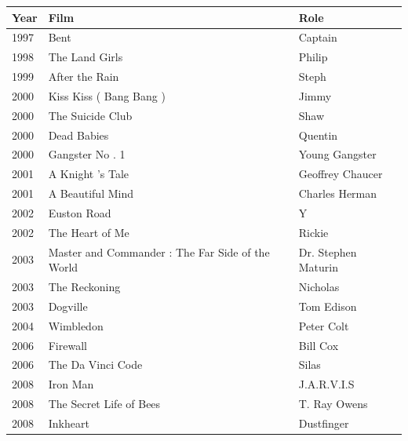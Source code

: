 \documentclass{article}
\begin{document}
\begin{tabular}{lll}
\toprule
Year & Film & Role \\
\midrule
1997 & Bent & Captain \\
1998 & The Land Girls & Philip \\
1999 & After the Rain & Steph \\
2000 & Kiss Kiss ( Bang Bang ) & Jimmy \\
2000 & The Suicide Club & Shaw \\
2000 & Dead Babies & Quentin \\
2000 & Gangster No . 1 & Young Gangster \\
2001 & A Knight 's Tale & Geoffrey Chaucer \\
2001 & A Beautiful Mind & Charles Herman \\
2002 & Euston Road & Y \\
2002 & The Heart of Me & Rickie \\
2003 & Master and Commander : The Far Side of the World & Dr. Stephen Maturin \\
2003 & The Reckoning & Nicholas \\
2003 & Dogville & Tom Edison \\
2004 & Wimbledon & Peter Colt \\
2006 & Firewall & Bill Cox \\
2006 & The Da Vinci Code & Silas \\
2008 & Iron Man & J.A.R.V.I.S \\
2008 & The Secret Life of Bees & T. Ray Owens \\
2008 & Inkheart & Dustfinger \\
\bottomrule
\end{tabular}
\end{document}
